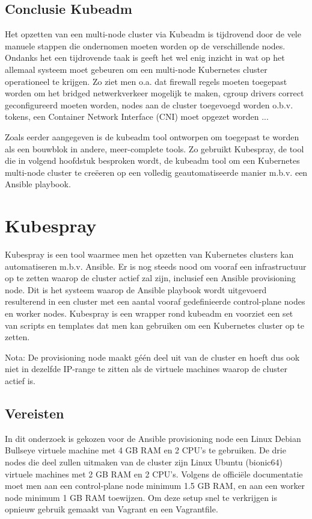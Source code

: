 \subsection{Conclusie Kubeadm}

Het opzetten van een multi-node cluster via Kubeadm is tijdrovend door de vele manuele stappen die ondernomen moeten worden op de verschillende nodes. Ondanks het een tijdrovende taak is geeft het wel enig inzicht in wat op het allemaal systeem moet gebeuren om een multi-node Kubernetes cluster operationeel te krijgen. Zo ziet men o.a. dat firewall regels moeten toegepast worden om het bridged netwerkverkeer mogelijk te maken, cgroup drivers correct geconfigureerd moeten worden, nodes aan de cluster toegevoegd worden o.b.v. tokens, een Container Network Interface (CNI) moet opgezet worden ... 

Zoals eerder aangegeven is de kubeadm tool ontworpen om toegepast te worden als een bouwblok in andere, meer-complete tools. Zo gebruikt Kubespray, de tool die in volgend hoofdstuk besproken wordt, de kubeadm tool om een Kubernetes multi-node cluster te creëeren op een volledig geautomatiseerde manier m.b.v. een Ansible playbook.       

\section{Kubespray}

Kubespray is een tool waarmee men het opzetten van Kubernetes clusters kan automatiseren m.b.v. Ansible. Er is nog steeds nood om vooraf een infrastructuur op te zetten waarop de cluster actief zal zijn, inclusief een Ansible provisioning node. Dit is het systeem waarop de Ansible playbook wordt uitgevoerd resulterend in een cluster met een aantal vooraf gedefinieerde control-plane nodes en worker nodes. Kubespray is een wrapper rond kubeadm en voorziet een set van scripts en templates dat men kan gebruiken om een Kubernetes cluster op te zetten. \autocite{Matykevich2018}

Nota: De provisioning node maakt géén deel uit van de cluster en hoeft dus ook niet in dezelfde IP-range te zitten als de virtuele machines waarop de cluster actief is.

\subsection{Vereisten}  

In dit onderzoek is gekozen voor de Ansible provisioning node een Linux Debian Bullseye virtuele machine met 4 GB RAM en 2 CPU's te gebruiken. De drie nodes die deel zullen uitmaken van de cluster zijn Linux Ubuntu (bionic64) virtuele machines met 2 GB RAM en 2 CPU's. Volgens de officiële documentatie moet men aan een control-plane node minimum 1.5 GB RAM, en aan een worker node minimum 1 GB RAM toewijzen. Om deze setup snel te verkrijgen is opnieuw gebruik gemaakt van Vagrant en een Vagrantfile. 

